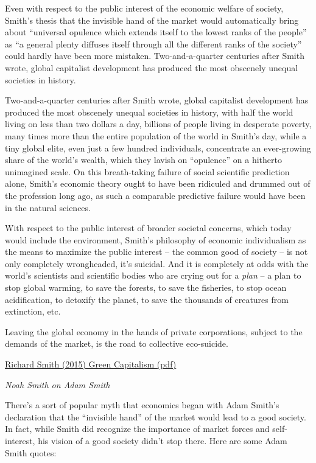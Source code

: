 \documentclass[
]{book}
\begin{document}
Even with respect to the public interest of the economic welfare of society, Smith's
thesis that the invisible hand of the market would automatically bring about
``universal opulence which extends itself to the lowest ranks of the people'' as ``a
general plenty diffuses itself through all the different ranks of the society'' could
hardly have been more mistaken. Two-and-a-quarter centuries after Smith wrote,
global capitalist development has produced the most obscenely unequal societies in
history.

Two-and-a-quarter centuries after Smith wrote,
global capitalist development has produced the most obscenely unequal societies in
history, with half the world living on less than two dollars a day, billions of people
living in desperate poverty, many times more than the entire population of the world
in Smith's day, while a tiny global elite, even just a few hundred individuals,
concentrate an ever-growing share of the world's wealth, which they lavish on
``opulence'' on a hitherto unimagined scale. On this breath-taking failure of social
scientific prediction alone, Smith's economic theory ought to have been ridiculed
and drummed out of the profession long ago, as such a comparable predictive failure
would have been in the natural sciences.

With respect to the public interest of broader societal concerns, which today would
include the environment, Smith's philosophy of economic individualism as the
means to maximize the public interest -- the common good of society -- is not only
completely wrongheaded, it's suicidal. And it is completely at odds with the world's
scientists and scientific bodies who are crying out for a \emph{plan} -- a plan to stop global
warming, to save the forests, to save the fisheries, to stop ocean acidification, to
detoxify the planet, to save the thousands of creatures from extinction, etc.

Leaving the global economy in the hands of private corporations,
subject to the demands of the market, is the road to collective eco-suicide.

\href{pdf/Richard_Smith_Green_Capitalism_the_God_that_Failed.pdf}{Richard Smith (2015) Green Capitalism (pdf)}

\emph{Noah Smith on Adam Smith}

There's a sort of popular myth that economics began with Adam Smith's declaration that the ``invisible hand'' of the market would lead to a good society. In fact, while Smith did recognize the importance of market forces and self-interest, his vision of a good society didn't stop there. Here are some Adam Smith quotes:
\end{document}
